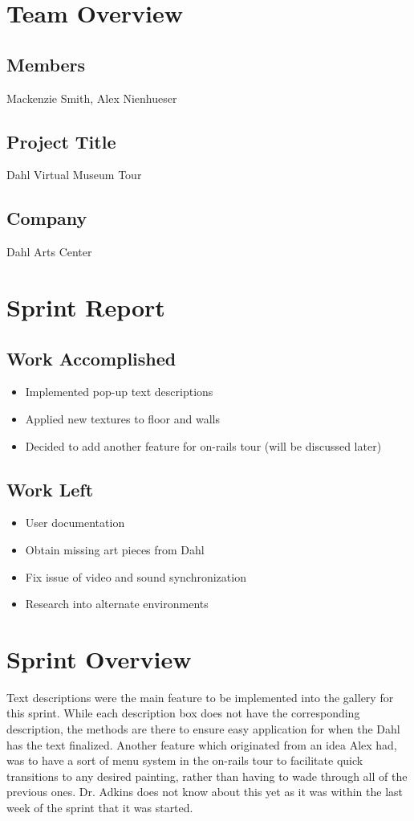 \documentclass[11pt]{book}
\begin{document}
\section*{Team Overview}
\hrulefill
\subsection*{Members}
Mackenzie Smith, Alex Nienhueser

\subsection*{Project Title}
Dahl Virtual Museum Tour

\subsection*{Company}
Dahl Arts Center


\section*{Sprint Report}
\hrulefill
\subsection*{Work Accomplished}
\begin{itemize}
\item Implemented pop-up text descriptions
\item Applied new textures to floor and walls
\item Decided to add another feature for on-rails tour (will be discussed later)


\end{itemize}
\subsection*{Work Left}
\begin{itemize}
\item User documentation
\item Obtain missing art pieces from Dahl
\item Fix issue of video and sound synchronization
\item Research into alternate environments
\end{itemize}

\section*{Sprint Overview}
Text descriptions were the main feature to be implemented into the gallery for this sprint.  While each description box does not have the corresponding description, the methods are there to ensure easy application for when the Dahl has the text finalized.  Another feature which originated from an idea Alex had, was to have a sort of menu system in the on-rails tour to facilitate quick transitions to any desired painting, rather than having to wade through all of the previous ones. Dr. Adkins does not know about this yet as it was within the last week of the sprint that it was started. 
\end{document}
